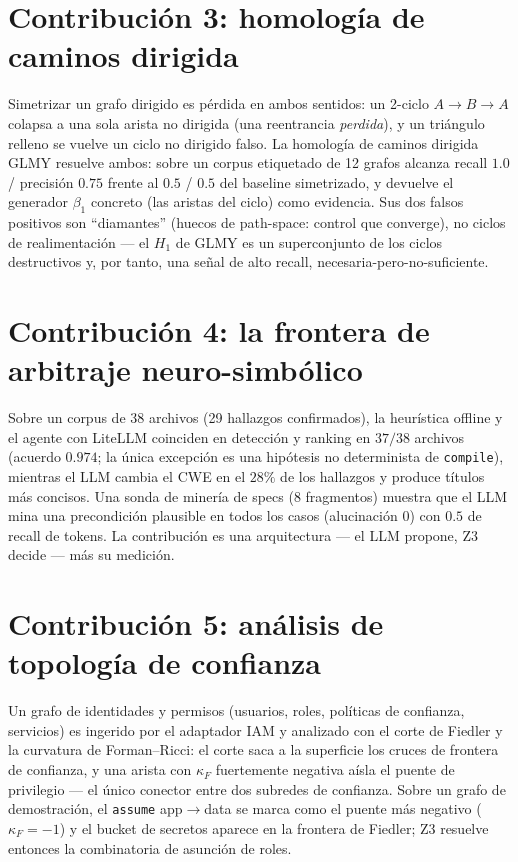 \documentclass[11pt]{article}
\begin{document}
\section{Contribución 3: homología de caminos dirigida}
Simetrizar un grafo dirigido es pérdida en ambos sentidos: un 2-ciclo
$A\to B\to A$ colapsa a una sola arista no dirigida (una reentrancia
\emph{perdida}), y un triángulo relleno se vuelve un ciclo no dirigido falso. La
homología de caminos dirigida GLMY resuelve ambos: sobre un corpus etiquetado de
12 grafos alcanza recall $1.0$ / precisión $0.75$ frente al $0.5$ / $0.5$ del
baseline simetrizado, y devuelve el generador $\beta_1$ concreto (las aristas del
ciclo) como evidencia. Sus dos falsos positivos son ``diamantes'' (huecos de
path-space: control que converge), no ciclos de realimentación --- el $H_1$ de
GLMY es un superconjunto de los ciclos destructivos y, por tanto, una señal de
alto recall, necesaria-pero-no-suficiente.

\section{Contribución 4: la frontera de arbitraje neuro-simbólico}
Sobre un corpus de 38 archivos (29 hallazgos confirmados), la heurística offline y
el agente con LiteLLM coinciden en detección y ranking en $37/38$ archivos
(acuerdo $0.974$; la única excepción es una hipótesis no determinista de
\texttt{compile}), mientras el LLM cambia el CWE en el $28\%$ de los hallazgos y
produce títulos más concisos. Una sonda de minería de specs (8 fragmentos)
muestra que el LLM mina una precondición plausible en todos los casos
(alucinación $0$) con $0.5$ de recall de tokens. La contribución es una
arquitectura --- el LLM propone, Z3 decide --- más su medición.

\section{Contribución 5: análisis de topología de confianza}
Un grafo de identidades y permisos (usuarios, roles, políticas de confianza,
servicios) es ingerido por el adaptador IAM y analizado con el corte de Fiedler y
la curvatura de Forman--Ricci: el corte saca a la superficie los cruces de
frontera de confianza, y una arista con $\kappa_F$ fuertemente negativa aísla el
puente de privilegio --- el único conector entre dos subredes de confianza. Sobre
un grafo de demostración, el \texttt{assume} app$\to$data se marca como el puente
más negativo ($\kappa_F=-1$) y el bucket de secretos aparece en la frontera de
Fiedler; Z3 resuelve entonces la combinatoria de asunción de roles.
\end{document}
